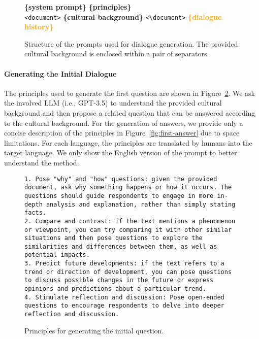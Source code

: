 \documentclass[11pt]{article}
\begin{document}
\begin{figure}[h]
\begin{tcolorbox}[colback=blue!2,colframe=blue!50!black]
\small
\textcolor{sblue}{\textbf{\{system prompt\}}}
\textcolor{sred}{\textbf{\{principles\}}} \\
\texttt{<document>}
\textcolor{sgreen}{\textbf{\{cultural background\}}}
\texttt{<\textbackslash document>}
\textcolor{orange}{\textbf{\{dialogue history\}}}
\end{tcolorbox}
\caption{Structure of the prompts used for dialogue generation. The provided cultural background is enclosed within a pair of separators.}
\label{fig:prompt-structure}
\end{figure}

\paragraph{Generating the Initial Dialogue} The principles used to generate the first question are shown in Figure~\ref{fig:first-question}. We ask the involved LLM (i.e., GPT-3.5) to understand the provided cultural background and then propose a related question that can be answered according to the cultural background.
For the generation of answers, we provide only a concise description of the principles in Figure~\ref{fig:first-answer} due to space limitations.
For each language, the principles are translated by humans into the target language. We only show the English version of the prompt to better understand the method.

\begin{figure}[h]
\begin{tcolorbox}[colback=red!2,colframe=red!50!black]
\small
\texttt{1. Pose "why" and "how" questions: given the provided document, ask why something happens or how it occurs. The questions should guide respondents to engage in more in-depth analysis and explanation, rather than simply stating facts. \\
2. Compare and contrast: if the text mentions a phenomenon or viewpoint, you can try comparing it with other similar situations and then pose questions to explore the similarities and differences between them, as well as potential impacts. \\
3. Predict future developments: if the text refers to a trend or direction of development, you can pose questions to discuss possible changes in the future or express opinions and predictions about a particular trend. \\
4. Stimulate reflection and discussion: Pose open-ended questions to encourage respondents to delve into deeper reflection and discussion.}
\end{tcolorbox}
\caption{Principles for generating the initial question.}
\label{fig:first-question}
\end{figure}
\end{document}

